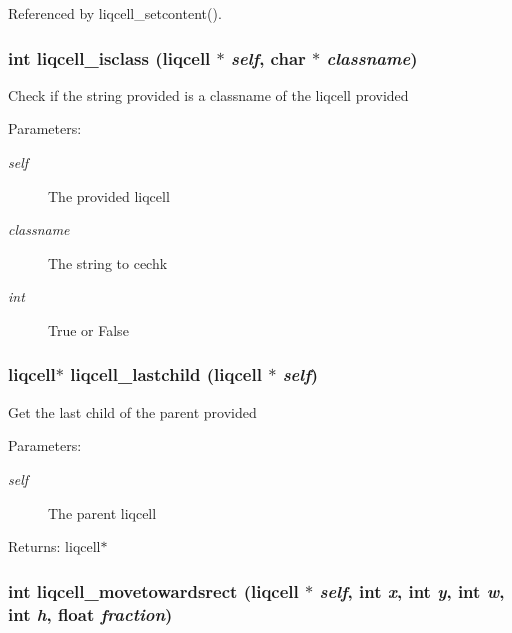 Referenced by liqcell\_\-setcontent().
\subsubsection[{liqcell\_\-isclass}]{\setlength{\rightskip}{0pt plus 5cm}int liqcell\_\-isclass (liqcell $\ast$ {\em self}, \/  char $\ast$ {\em classname})}\label{d5/da2/liqcell_8c_0a0c5640d3f6c8afc9c65fd9ecc9765d}


Check if the string provided is a classname of the liqcell provided \begin{Desc}
\item[Parameters:]
\begin{description}
\item[{\em self}]The provided liqcell \item[{\em classname}]The string to cechk \item[{\em int}]True or False \end{description}
\end{Desc}
\subsubsection[{liqcell\_\-lastchild}]{\setlength{\rightskip}{0pt plus 5cm}liqcell$\ast$ liqcell\_\-lastchild (liqcell $\ast$ {\em self})}\label{d5/da2/liqcell_8c_18e2aefa01c9d9eee6d241689e9454c3}


Get the last child of the parent provided \begin{Desc}
\item[Parameters:]
\begin{description}
\item[{\em self}]The parent liqcell \end{description}
\end{Desc}
\begin{Desc}
\item[Returns:]liqcell$\ast$ \end{Desc}
\subsubsection[{liqcell\_\-movetowardsrect}]{\setlength{\rightskip}{0pt plus 5cm}int liqcell\_\-movetowardsrect (liqcell $\ast$ {\em self}, \/  int {\em x}, \/  int {\em y}, \/  int {\em w}, \/  int {\em h}, \/  float {\em fraction})}\label{d5/da2/liqcell_8c_8d005bfc84ca09d136e2ef94c47fdf8b}


